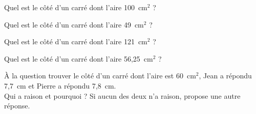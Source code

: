 \begin{myenumerate}
  \item Quel est le côté d'un carré dont l'aire 100~cm$^2$ ?
  \item Quel est le côté d'un carré dont l'aire 49~cm$^2$ ?
  \item Quel est le côté d'un carré dont l'aire 121~cm$^2$ ?
  \item Quel est le côté d'un carré dont l'aire 56,25~cm$^2$ ?
  \item \`A la question \og trouver le côté d'un carré dont l'aire est 60~cm$^2$\fg, Jean a répondu 7,7~cm et Pierre a répondu 7,8~cm.
    \\Qui a raison et pourquoi ? Si aucun des deux n'a raison, propose une autre réponse.
\end{myenumerate}